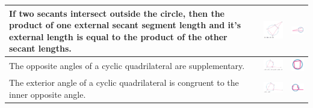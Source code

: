\documentclass[a4paper,10pt]{report}
\begin{document}
\begin{center}
\begin{tabular}[center]{|p{5cm}|p{3cm}|p{2cm}|}
		If two secants intersect outside the circle, then the product of one external secant segment length and it's external length is equal to the product of the other secant lengths.                                            & \includegraphics[width=3cm]{circle theorem 13} & \includegraphics[width=2cm]{circle theorem 13 symbol} \\ \hline
		The opposite angles of a cyclic quadrilateral are supplementary.                                                                                                                                                             & \includegraphics[width=3cm]{circle theorem 14} & \includegraphics[width=2cm]{circle theorem 14 symbol} \\ \hline
		The exterior angle of a cyclic quadrilateral is congruent to the inner opposite angle.                                                                                                                                       & \includegraphics[width=3cm]{circle theorem 15} & \includegraphics[width=2cm]{circle theorem 15 symbol} \\ \hline
	\end{tabular}
\end{center}
\end{document}
